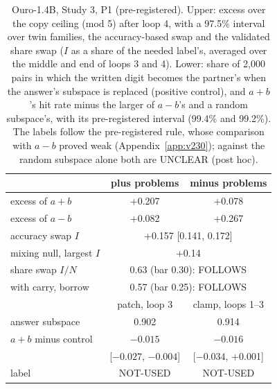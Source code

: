 \documentclass{article}
\begin{document}
\begin{table}[t]
\centering
\caption{Ouro-1.4B, Study 3, P1 (pre-registered). Upper: excess over the copy ceiling (mod 5) after loop 4, with a 97.5\% interval over twin families, the accuracy-based swap and the validated share swap ($I$ as a share of the needed label's, averaged over the middle and end of loops 3 and 4). Lower: share of 2,000 pairs in which the written digit becomes the partner's when the answer's subspace is replaced (positive control), and $a+b$'s hit rate minus the larger of $a-b$'s and a random subspace's, with its pre-registered interval (99.4\% and 99.2\%). The labels follow the pre-registered rule, whose comparison with $a-b$ proved weak (Appendix~\ref{app:v230}); against the random subspace alone both are UNCLEAR (post hoc).}
\label{tab:ouro}
\small
\setlength{\tabcolsep}{3pt}
\begin{tabular}{@{}lcc@{}}
\toprule
 & plus problems & minus problems \\
\midrule
excess of $a+b$ & +0.207 & +0.078 \\
excess of $a-b$ & +0.082 & +0.267 \\
accuracy swap $I$ & \multicolumn{2}{c}{+0.157 [0.141, 0.172]} \\
mixing null, largest $I$ & \multicolumn{2}{c}{+0.14} \\
share swap $I/N$ & \multicolumn{2}{c}{0.63 (bar 0.30): FOLLOWS} \\
\quad with carry, borrow & \multicolumn{2}{c}{0.57 (bar 0.25): FOLLOWS} \\
\midrule
 & patch, loop 3 & clamp, loops 1--3 \\
\midrule
answer subspace & 0.902 & 0.914 \\
$a+b$ minus control & $-0.015$ & $-0.016$ \\
 & [$-0.027$, $-0.004$] & [$-0.034$, +0.001] \\
label & NOT-USED & NOT-USED \\
\bottomrule
\end{tabular}
\end{table}
\end{document}
